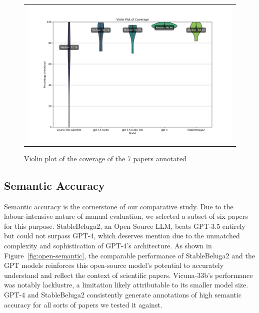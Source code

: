 \begin{figure}[htpb]
  \centering
  \begin{tabular}{c}
  \includegraphics[width=14cm]{images/open-coverage.png}
  \end{tabular}
  \caption[Open Source Coverage]{Violin plot of the coverage of the 7 papers annotated}\label{fig:open-coverage}
\end{figure}

\subsection{Semantic Accuracy}

Semantic accuracy is the cornerstone of our comparative study. Due to the labour-intensive nature of manual evaluation, we selected a subset of six papers for this purpose. StableBeluga2, an Open Source LLM, beats GPT-3.5 entirely but could not surpass GPT-4, which deserves mention due to the unmatched complexity and sophistication of GPT-4's architecture. As shown in Figure~\ref{fig:open-semantic}, the comparable performance of StableBeluga2 and the GPT models reinforces this open-source model's potential to accurately understand and reflect the context of scientific papers. Vicuna-33b's performance was notably lacklustre, a limitation likely attributable to its smaller model size. GPT-4 and StableBeluga2 consistently generate annotations of high semantic accuracy for all sorts of papers we tested it against.

